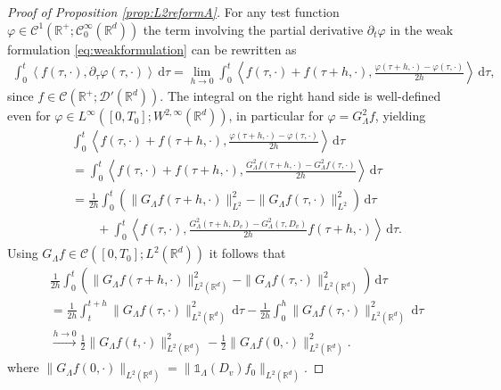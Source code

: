 \documentclass[11pt,a4paper,reqno]{amsart}
\theoremstyle{plain}
\theoremstyle{definition}
\begin{document}
\begin{proof}[Proof of Proposition \ref{prop:L2reformA}]
For any test function $\varphi\in\mathcal{C}^1({\mathbb{R}}^+; \mathcal{C}_0^{\infty}({\mathbb{R}}^d))$ the term involving the partial derivative $\partial_t\varphi$ in the weak formulation \eqref{eq:weakformulation} can be rewritten as
\begin{align*}
	\int_0^t \left\langle f(\tau, \cdot), \partial_{\tau}\varphi(\tau,\cdot)\right\rangle \,\mathrm{d}\tau = \lim_{h\to 0} \int_0^t \left\langle f(\tau, \cdot) + f(\tau+h,\cdot), \frac{\varphi(\tau+h,\cdot)-\varphi(\tau,\cdot)}{2h}\right\rangle\,\mathrm{d}\tau,
\end{align*}
since $f\in\mathcal{C}({\mathbb{R}}^+; \mathcal{D}'({\mathbb{R}}^d))$. The integral on the right hand side is well-defined even for $\varphi\in L^{\infty}([0,T_0]; W^{2,\infty}({\mathbb{R}}^d))$, in particular for $\varphi = G_{\Lambda}^2f$, yielding
\begin{align*}
	&\int_0^t \left\langle f(\tau, \cdot) + f(\tau+h,\cdot) ,\frac{\varphi(\tau+h,\cdot)-\varphi(\tau,\cdot)}{2h}\right\rangle \,\mathrm{d}\tau \\
	&= \int_0^t \left\langle f(\tau, \cdot) + f(\tau+h,\cdot), \frac{G_{\Lambda}^2f(\tau+h,\cdot)-G_{\Lambda}^2f(\tau,\cdot)}{2h}\right\rangle \,\mathrm{d}\tau \\
	&= \frac{1}{2h} \int_0^t \left(\|G_{\Lambda}f(\tau+h,\cdot)\|_{L^2}^2-\|G_{\Lambda}f(\tau,\cdot)\|_{L^2}^2 \right)\,\mathrm{d}\tau \\ &\qquad + \int_0^t \left\langle f(\tau, \cdot), \frac{G_{\Lambda}^2(\tau+h, D_v) - G_{\Lambda}^2(\tau, D_v)}{2h} f(\tau+h,\cdot) \right\rangle \,\mathrm{d}\tau.
\end{align*}
Using $G_{\Lambda}f\in\mathcal{C}([0,T_0]; L^2({\mathbb{R}}^d))$ it follows that
\begin{align*}
	&\frac{1}{2h} \int_0^t \left(\|G_{\Lambda}f(\tau + h, \cdot)\|_{L^2({\mathbb{R}}^d)}^2 - \|G_{\Lambda}f(\tau, \cdot)\|_{L^2({\mathbb{R}}^d)}^2 \right) \,\mathrm{d}\tau \\
	&= \frac{1}{2h} \int_t^{t+h} \|G_{\Lambda}f(\tau, \cdot)\|_{L^2({\mathbb{R}}^d)}^2 \,\mathrm{d}\tau - \frac{1}{2h} \int_0^h \|G_{\Lambda}f(\tau, \cdot)\|_{L^2({\mathbb{R}}^d)}^2\,\mathrm{d}\tau \\
	&\stackrel{h\to 0}{\longrightarrow} \frac{1}{2} \|G_{\Lambda}f(t,\cdot)\|_{L^2({\mathbb{R}}^d)}^2 - \frac{1}{2}\|G_{\Lambda}f(0, \cdot)\|_{L^2({\mathbb{R}}^d)}^2.
\end{align*}
where $\|G_{\Lambda}f(0, \cdot)\|_{L^2({\mathbb{R}}^d)} = \|{\mathds{1}}_{\Lambda}(D_v)f_0\|_{L^2({\mathbb{R}}^d)}$.

\end{proof}
\end{document}
